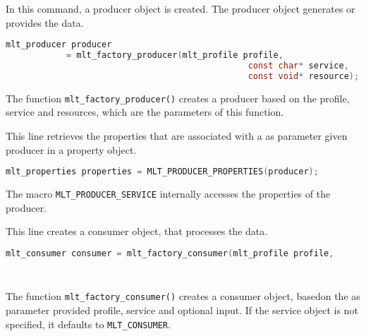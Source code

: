 \documentclass[../MasterThesis.tex]{subfiles}
\begin{document}
\begin{description}[font=\normalfont\color{RedViolet!80!black}, style=nextline]
	In this command, a producer object is created. The producer object generates or provides the data.

	\begin{lstlisting}[language=C, numbers=none, basicstyle=\footnotesize\ttfamily, belowskip=0pt, aboveskip=9pt]
	mlt_producer producer 
			= mlt_factory_producer(mlt_profile profile,
												const char* service,
												const void* resource); \end{lstlisting}
																						  
	The function \texttt{mlt\_factory\_producer()} creates a producer based on the profile, service and resources, which are the parameters of this function.


	
	
	\item[Create properties] 
	
	This line retrieves the properties that are associated with a as parameter given producer in a property object.
	
	\begin{lstlisting}[language=C, numbers=none, basicstyle=\footnotesize\ttfamily, belowskip=0pt, aboveskip=9pt]
	mlt_properties properties = MLT_PRODUCER_PROPERTIES(producer); \end{lstlisting}
	
	The macro \texttt{MLT\_PRODUCER\_SERVICE} internally accesses the properties of the producer.
	
	
	
	\item[Create a consumer] 
	
	This line creates a consumer object, that processes the data.
	
	\begin{lstlisting}[language=C, numbers=none, basicstyle=\footnotesize\ttfamily, belowskip=0pt, aboveskip=9pt]
	mlt_consumer consumer = mlt_factory_consumer(mlt_profile profile, 
																			const char* service, 
																			const void* input); \end{lstlisting}
																
	The function \texttt{mlt\_factory\_consumer()} creates a consumer object, basedon the as parameter provided profile, service and optional input. If the service object is not specified, it defaults to \texttt{MLT\_CONSUMER}.
											
																
	

\end{description}
\end{document}
